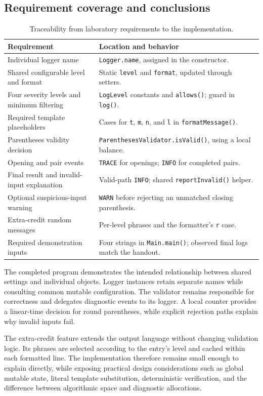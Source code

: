 \documentclass[12pt,a4paper]{article}
\newcommand{\code}[1]{\texttt{#1}}
\begin{document}
\subsection{Requirement coverage and conclusions}
\begin{table}[H]
\centering\small
\begin{tabularx}{\textwidth}{@{}p{}Y@{}}
\toprule
\textbf{Requirement} & \textbf{Location and behavior}\\
\midrule
Individual logger name & \code{Logger.name}, assigned in the constructor.\\
Shared configurable level and format & Static \code{level} and \code{format}, updated through setters.\\
Four severity levels and minimum filtering & \code{LogLevel} constants and \code{allows()}; guard in \code{log()}.\\
Required template placeholders & Cases for \code{t}, \code{m}, \code{n}, and \code{l} in \code{formatMessage()}.\\
Parentheses validity decision & \code{ParenthesesValidator.isValid()}, using a local balance.\\
Opening and pair events & \code{TRACE} for openings; \code{INFO} for completed pairs.\\
Final result and invalid-input explanation & Valid-path \code{INFO}; shared \code{reportInvalid()} helper.\\
Optional suspicious-input warning & \code{WARN} before rejecting an unmatched closing parenthesis.\\
Extra-credit random messages & Per-level phrases and the formatter's \code{r} case.\\
Required demonstration inputs & Four strings in \code{Main.main()}; observed final logs match the handout.\\
\bottomrule
\end{tabularx}
\caption{Traceability from laboratory requirements to the implementation.}
\end{table}

The completed program demonstrates the intended relationship between shared settings and individual objects. Logger instances retain separate names while consulting common mutable configuration. The validator remains responsible for correctness and delegates diagnostic events to its logger. A local counter provides a linear-time decision for round parentheses, while explicit rejection paths explain why invalid inputs fail.

The extra-credit feature extends the output language without changing validation logic. Its phrases are selected according to the entry's level and cached within each formatted line. The implementation therefore remains small enough to explain directly, while exposing practical design considerations such as global mutable state, literal template substitution, deterministic verification, and the difference between algorithmic space and diagnostic allocations.
\end{document}

